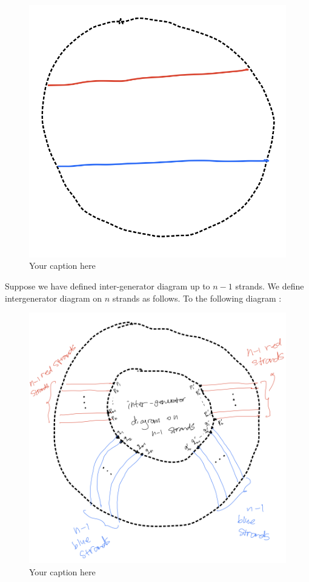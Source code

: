 \begin{figure}[H] %
    \centering
    \includegraphics[width=\linewidth]{diagrams/definition14-1/2.png} %
    \caption{Your caption here}
    \label{fig:your-label}
\end{figure}

Suppose we have defined inter-generator diagram up to $n-1$ strands. We define intergenerator diagram on $n$ strands as follows. To the following diagram :

\begin{figure}[H] %
    \centering
    \includegraphics[width=\linewidth]{diagrams/definition14-1/3.png} %
    \caption{Your caption here}
    \label{fig:your-label}
\end{figure}

